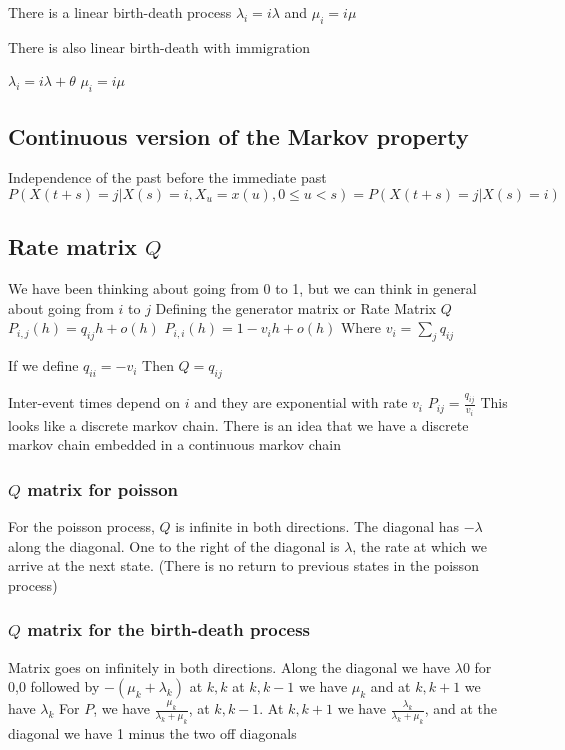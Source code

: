 \documentclass[12pt]{report}
\begin{document}
There is a linear birth-death process $\lambda_i=i \lambda$ and $\mu_i = i\mu$

There is also linear birth-death with immigration

$\lambda_i = i \lambda + \theta$
$\mu_i = i \mu$
\subsection{Continuous version of the Markov property}
\label{sec-1-3}

Independence of the past before the immediate past
$P(X(t+s)=j|X(s)=i,X_u=x(u),0 \leq u < s ) = P(X(t+s)=j|X(s)=i)$
\subsection{Rate matrix $Q$}
\label{sec-1-4}

We have been thinking about going from 0 to 1, but we can think in general about going from $i$ to $j$ 
Defining the generator matrix or Rate Matrix $Q$
$P_{i,j}(h) = q_{ij} h + o(h)$
$P_{i,i}(h)= 1- v_i h + o(h)$ Where $v_i = \sum_j q_{ij}$

If we define $q_{ii}=-v_i$ Then $Q = {q_{ij}}$

Inter-event times depend on $i$ and they are exponential with rate $v_i$
$P_{ij}=\frac{q_{ij}}{v_i}$
This looks like a discrete markov chain. There is an idea that we have a discrete markov chain embedded in a continuous markov chain
\subsubsection{$Q$ matrix for poisson}
\label{sec-1-4-1}

For the poisson process, $Q$ is infinite in both directions.   
The diagonal has $-\lambda$ along the diagonal. One to the right of the diagonal is $\lambda$, the rate at which we arrive at the next state. (There is no return to previous states in the poisson process)
 
\subsubsection{$Q$ matrix for the birth-death process}
\label{sec-1-4-2}

Matrix goes on infinitely in both directions.  Along the diagonal we have $\lambda0$ for 0,0 followed by $-(\mu_k+\lambda_k)$ at $k,k$  at $k,k-1$ we have $\mu_k$ and at $k,k+1$ we have $\lambda_k$
For $P$, we have $\frac{\mu_k}{\lambda_k+\mu_k}$, at $k,k-1$.  At $k,k+1$ we have $\frac{\lambda_k}{\lambda_k+\mu_k}$, and at the diagonal we have 1 minus the two off diagonals
\end{document}
